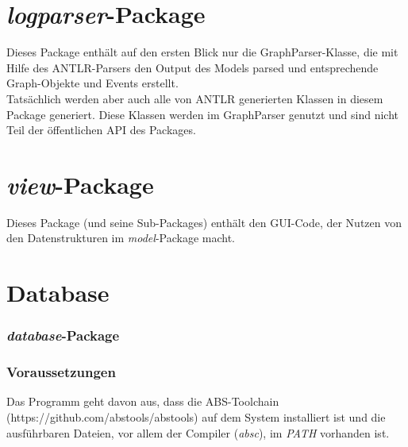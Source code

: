 \documentclass[accentcolor=tud0b,12pt,paper=a4]{tudreport}
\begin{document}
	\chapter{\textit{logparser}-Package}
	\label{logparser}
	Dieses Package enthält auf den ersten Blick nur die GraphParser-Klasse, die mit Hilfe des ANTLR-Parsers den Output des Models parsed und entsprechende Graph-Objekte und Events erstellt.\\
	Tatsächlich werden aber auch alle von ANTLR generierten Klassen in diesem Package generiert. Diese Klassen werden im GraphParser genutzt und sind nicht Teil der öffentlichen API des Packages.
		
	\chapter{\textit{view}-Package}
	Dieses Package (und seine Sub-Packages) enthält den GUI-Code, der Nutzen von den Datenstrukturen im \textit{model}-Package macht.
	
	\chapter{Database}
	\label{database}
		\subsection{\textit{database}-Package}
		\subsection{Voraussetzungen}
		Das Programm geht davon aus, dass die ABS-Toolchain (https://github.com/abstools/abstools) auf dem System installiert ist und die ausführbaren Dateien, vor allem der Compiler (\textit{absc}), im \textit{PATH} vorhanden ist.
	
\end{document}
